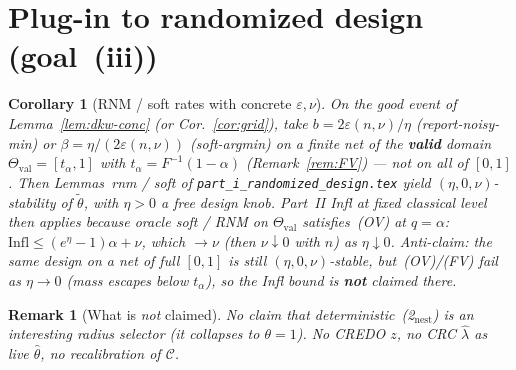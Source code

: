 \documentclass[11pt]{article}
\newtheorem{corollary}{Corollary}
\newtheorem{remark}{Remark}
\begin{document}
\section{Plug-in to randomized design (goal~(iii))}

\begin{corollary}[RNM / soft rates with concrete $\varepsilon,\nu$]
\label{cor:plug}
On the good event of Lemma~\ref{lem:dkw-conc} (or Cor.~\ref{cor:grid}), take
$b=2\varepsilon(n,\nu)/\eta$ (report-noisy-min) or
$\beta=\eta/(2\varepsilon(n,\nu))$ (soft-argmin) on a finite net of the
\textbf{valid} domain $\Theta_{\mathrm{val}}=[t_\alpha,1]$ with
$t_\alpha=F^{-1}(1-\alpha)$ (Remark~\ref{rem:FV}) --- not on all of $[0,1]$.
Then Lemmas~rnm / soft of \texttt{part\_i\_randomized\_design.tex} yield
$(\eta,0,\nu)$-stability of $\tilde\theta$, with $\eta>0$ a free design knob.
Part~II Infl at fixed classical level then applies because oracle soft / RNM on
$\Theta_{\mathrm{val}}$ satisfies~(OV) at $q=\alpha$:
$\mathrm{Infl}\le(e^\eta-1)\alpha+\nu$, which $\to\nu$ (then $\nu\downarrow 0$ with $n$) as $\eta\downarrow 0$.
\textit{Anti-claim:} the same design on a net of full $[0,1]$ is still
$(\eta,0,\nu)$-stable, but~(OV)/(FV) fail as $\eta\to 0$ (mass escapes below $t_\alpha$),
so the Infl bound is \textbf{not} claimed there.
\end{corollary}

\begin{remark}[What is \emph{not} claimed]
No claim that deterministic~(2$_{\mathrm{nest}}$) is an interesting radius selector
(it collapses to $\theta=1$).
No CREDO $z$, no CRC $\hat\lambda$ as live $\hat\theta$, no recalibration of $\mathcal{C}$.
\end{remark}
\end{document}
